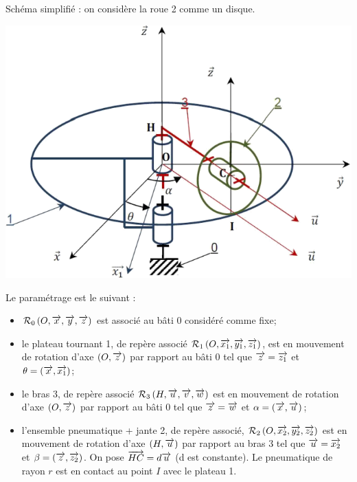 \documentclass[10pt]{article}
\begin{document}
\begin{minipage}[c]{.45\linewidth}
Schéma simplifié : on considère la roue 2 comme un disque. 
\begin{center}
\includegraphics[width=\textwidth]{images/fig_07}
\end{center}
\end{minipage} \hfill
\begin{minipage}[c]{.53\linewidth}

Le paramétrage est le suivant : 
\begin{itemize}
\item $\mathcal{R}_0\left( O,\overrightarrow{x},\overrightarrow{y},\overrightarrow{z}\right)$  est associé au bâti 0 considéré comme fixe;
\item le plateau tournant 1, de repère associé $\mathcal{R}_1\left( O,\overrightarrow{x_1},\overrightarrow{y_1},\overrightarrow{z_1}\right)$, est en mouvement de rotation d’axe $\left(O,\overrightarrow{z}\right)$ par rapport au bâti 0 tel que $\overrightarrow{z}=\overrightarrow{z_1}$ et $\theta=\left(\overrightarrow{x},\overrightarrow{x_1}\right)$;
\item le bras 3, de repère associé $\mathcal{R}_3\left( H,\overrightarrow{u},\overrightarrow{v},\overrightarrow{w}\right)$ est en mouvement de rotation d’axe $\left(O,\overrightarrow{z}\right)$ par rapport au bâti 0 tel que $\overrightarrow{z}=\overrightarrow{w}$ et $\alpha = \left(\overrightarrow{x},\overrightarrow{u}\right)$;
\item l’ensemble pneumatique + jante 2, de repère associé, $\mathcal{R}_2\left( O,\overrightarrow{x_2},\overrightarrow{y_2},\overrightarrow{z_2}\right)$ est en mouvement de rotation d’axe $\left(H,\overrightarrow{u}\right)$ par rapport au bras 3 tel que $\overrightarrow{u}=\overrightarrow{x_2}$ et $\beta = \left(\overrightarrow{z},\overrightarrow{z_2}\right)$. On pose $\overrightarrow{HC}=d\overrightarrow{u}$ (d est constante). Le pneumatique de rayon $r$ est en contact au point $I$ avec le plateau 1. 
\end{itemize}
\end{minipage}
\end{document}
